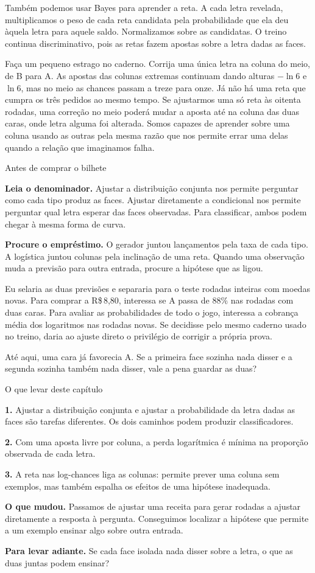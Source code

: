 \documentclass[12pt,oneside]{article}
\newcommand{\itemq}[1]{\par\textbf{#1.}\enspace}
\newcommand{\bookanchor}[1]{\phantomsection\label{#1}}
\begin{document}
Também\bookanchor{topic-04-4} podemos usar Bayes para aprender a reta. A cada letra revelada, multiplicamos o peso de cada reta candidata pela probabilidade que ela deu àquela letra para aquele saldo. Normalizamos sobre as candidatas. O treino continua discriminativo, pois as retas fazem apostas sobre a letra dadas as faces.

Faça um pequeno estrago no caderno. Corrija uma única letra na coluna do meio, de B para A. As apostas das colunas extremas continuam dando alturas $-\ln 6$ e $\ln 6$, mas no meio as chances passam a treze para onze. Já não há uma reta que cumpra os três pedidos ao mesmo tempo. Se ajustarmos uma só reta às oitenta rodadas, uma correção no meio poderá mudar a aposta até na coluna das duas caras, onde letra alguma foi alterada. Somos capazes de aprender sobre uma coluna usando as outras pela mesma razão que nos permite errar uma delas quando a relação que imaginamos falha.

\begin{quadro}{Antes de comprar o bilhete}
\itemq{Leia o denominador} Ajustar a distribuição conjunta nos permite perguntar como cada tipo produz as faces. Ajustar diretamente a condicional nos permite perguntar qual letra esperar das faces observadas. Para classificar, ambos podem chegar à mesma forma de curva.
\itemq{Procure o empréstimo} O gerador juntou lançamentos pela taxa de cada tipo. A logística juntou colunas pela inclinação de uma reta. Quando uma observação muda a previsão para outra entrada, procure a hipótese que as ligou.
\end{quadro}

Eu selaria as duas previsões e separaria para o teste rodadas inteiras com moedas novas. Para comprar a R\$\,8,80, interessa se A passa de $88\%$ nas rodadas com duas caras. Para avaliar as probabilidades de todo o jogo, interessa a cobrança média dos logaritmos nas rodadas novas. Se decidisse pelo mesmo caderno usado no treino, daria ao ajuste direto o privilégio de corrigir a própria prova.

Até aqui, uma cara já favorecia A. Se a primeira face sozinha nada disser e a segunda sozinha também nada disser, vale a pena guardar as duas?

\begin{quadro}{O que levar deste capítulo}
\itemq{1} Ajustar a distribuição conjunta e ajustar a probabilidade da letra dadas as faces são tarefas diferentes. Os dois caminhos podem produzir classificadores.
\itemq{2} Com uma aposta livre por coluna, a perda logarítmica é mínima na proporção observada de cada letra.
\itemq{3} A reta nas log-chances liga as colunas: permite prever uma coluna sem exemplos, mas também espalha os efeitos de uma hipótese inadequada.
\itemq{O que mudou} Passamos de ajustar uma receita para gerar rodadas a ajustar diretamente a resposta à pergunta. Conseguimos localizar a hipótese que permite a um exemplo ensinar algo sobre outra entrada.
\itemq{Para levar adiante} Se cada face isolada nada disser sobre a letra, o que as duas juntas podem ensinar?
\end{quadro}
\end{document}
